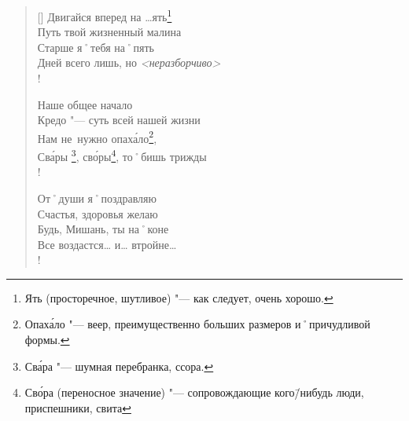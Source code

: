 \begin{verse}[\versewidth]
Двигайся вперед на …ять\footnote{Ять (просторечное, шутливое) "--- как следует, очень хорошо.}      \\
Путь твой жизненный малина     \\
Старше я˚тебя на˚пять          \\
Дней всего лишь, но \textit{<неразборчиво>}\todo[Неразборчиво]{} \\!


\vin Наше общее начало              \\
\vin Кредо "--- суть всей нашей жизни  \\
\vin Нам не~нужно опах\'{а}ло\footnote{Опах\'{а}ло "--- веер, преимущественно больших размеров и˚причудливой формы.},          \\
\vin Св\'{а}ры \footnote{Св\'{а}ра "--- шумная перебранка, ссора.}, св\'{о}ры\footnote{Св\'{о}ра (переносное значение) "--- сопровождающие кого\=/нибудь люди, приспешники, свита}, то˚бишь трижды \\!

От˚души я˚поздравляю           \\
Счастья, здоровья желаю        \\
Будь, Мишань, ты на˚коне       \\
Все воздастся… и… втройне…		\\!
\end{verse}

